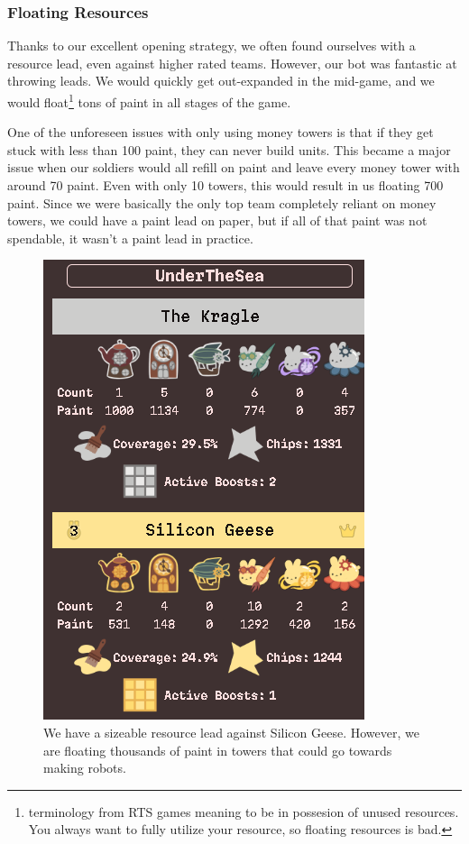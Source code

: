 \subsubsection{Floating Resources}

Thanks to our excellent opening strategy, we often found ourselves with a resource lead, even against higher rated teams. However, our bot was fantastic at throwing leads. We would quickly get out-expanded in the mid-game, and we would float\footnote{terminology from RTS games meaning to be in possesion of unused resources. You always want to fully utilize your resource, so floating resources is bad.} tons of paint in all stages of the game.

\medskip

One of the unforeseen issues with only using money towers is that if they get stuck with less than 100 paint, they can never build units. This became a major issue when our soldiers would all refill on paint and leave every money tower with around 70 paint. Even with only 10 towers, this would result in us floating 700 paint. Since we were basically the only top team completely reliant on money towers, we could have a paint lead on paper, but if all of that paint was not spendable, it wasn't a paint lead in practice.

\begin{figure}[h]
    \centering
    \includegraphics[scale=0.5]{images/floating_resources.png}
    \caption{We have a sizeable resource lead against Silicon Geese. However, we are floating thousands of paint in towers that could go towards making robots.}
\end{figure}

